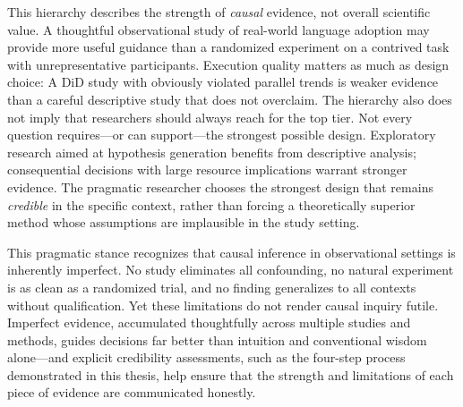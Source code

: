 This hierarchy describes the strength of \emph{causal} evidence, not overall scientific value.
A thoughtful observational study of real-world language adoption may provide more useful guidance than a randomized experiment on a contrived task with unrepresentative participants.
Execution quality matters as much as design choice: A DiD study with obviously violated parallel trends is weaker evidence than a careful descriptive study that does not overclaim.
The hierarchy also does not imply that researchers should always reach for the top tier.
Not every question requires---or can support---the strongest possible design.
Exploratory research aimed at hypothesis generation benefits from descriptive analysis; consequential decisions with large resource implications warrant stronger evidence.
The pragmatic researcher chooses the strongest design that remains \emph{credible} in the specific context, rather than forcing a theoretically superior method whose assumptions are implausible in the study setting.

This pragmatic stance recognizes that causal inference in observational settings is inherently imperfect.
No study eliminates all confounding, no natural experiment is as clean as a randomized trial, and no finding generalizes to all contexts without qualification.
Yet these limitations do not render causal inquiry futile.
Imperfect evidence, accumulated thoughtfully across multiple studies and methods, guides decisions far better than intuition and conventional wisdom alone---and explicit credibility assessments, such as the four-step process demonstrated in this thesis, help ensure that the strength and limitations of each piece of evidence are communicated honestly.
